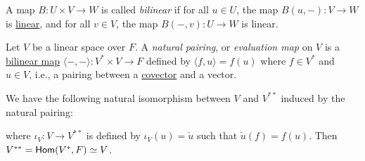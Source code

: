\begin{center}
  \qquad\qquad
\end{center}

\begin{definition}\label{def:bilinear_map}
  A map $B \colon U \times V \to W$ is called \emph{bilinear} if for all $u \in U$, the map $B(u, -) \colon V \to W$ is \hyperref[def:linear_map]{linear}, and for all $v \in V$, the map $B(-, v) \colon U \to W$ is linear.
\end{definition}

\begin{definition}\label{def:pairing}
  Let $V$ be a linear space over $F$. A \emph{natural pairing}, or \emph{evaluation map} on $V$ is a \hyperref[def:bilinear_map]{bilinear map} $\langle-,-\rangle \colon V^* \times V \to F$ defined by $\langle f, u \rangle = f(u)$ where $f \in V^*$ and $u \in V$, i.e., a pairing between a \hyperref[def:linear_functional]{covector} and a vector.
\end{definition}

We have the following natural isomorphism between $V$ and $V^{**}$ induced by the natural pairing:
\begin{center}
\end{center}
where $\iota_V \colon V \to V^{**}$ is defined by $\iota_V(u) = \check{u}$ such that $\check{u}(f) = f(u)$. Then $V^{**} = \operatorname{\text{\normalfont\sffamily Hom}}(V^*, F) \simeq V$.

